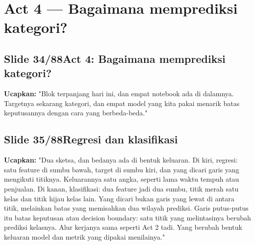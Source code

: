 \documentclass[11pt]{article}
\renewcommand{\framebox}[1]{\colorbox{acc!15}{\textcolor{acc}{\textbf{#1}}}}
\begin{document}
\section{Act 4 — Bagaimana memprediksi kategori?}

\subsection*{\framebox{Slide 34/88}\quad Act 4: Bagaimana memprediksi kategori?}
\textbf{Ucapkan:} "Blok terpanjang hari ini, dan empat notebook ada di dalamnya. Targetnya sekarang kategori, dan empat model yang kita pakai menarik batas keputusannya dengan cara yang berbeda-beda."\\[2pt]

\subsection*{\framebox{Slide 35/88}\quad Regresi dan klasifikasi}
\textbf{Ucapkan:} "Dua sketsa, dan bedanya ada di bentuk keluaran. Di kiri, regresi: satu feature di sumbu bawah, target di sumbu kiri, dan yang dicari garis yang mengikuti titiknya. Keluarannya satu angka, seperti lama waktu tempuh atau penjualan. Di kanan, klasifikasi: dua feature jadi dua sumbu, titik merah satu kelas dan titik hijau kelas lain. Yang dicari bukan garis yang lewat di antara titik, melainkan batas yang memisahkan dua wilayah prediksi. Garis putus-putus itu batas keputusan atau decision boundary: satu titik yang melintasinya berubah prediksi kelasnya. Alur kerjanya sama seperti Act 2 tadi. Yang berubah bentuk keluaran model dan metrik yang dipakai menilainya."\\[2pt]
\end{document}
